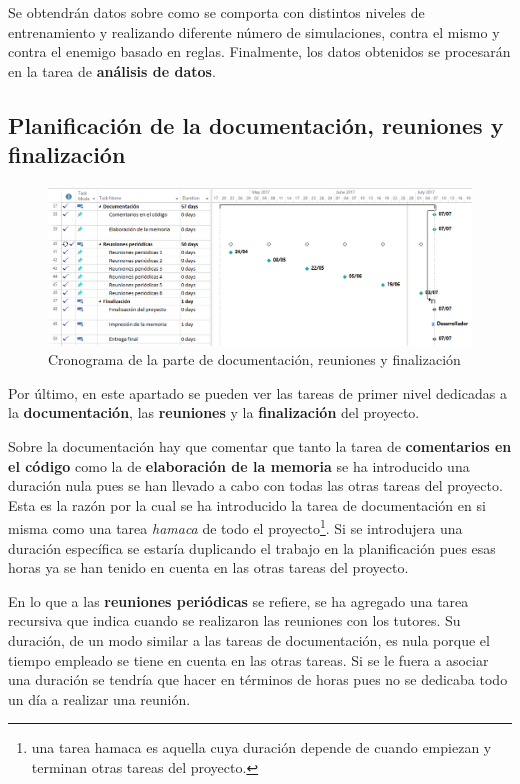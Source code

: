 \bigskip

Se obtendrán datos sobre como se comporta con distintos niveles de entrenamiento y realizando diferente número de simulaciones, contra el mismo y contra el enemigo basado en reglas. Finalmente, los datos obtenidos se procesarán en la tarea de \textbf{análisis de datos}.


\subsection{Planificación de la documentación, reuniones y finalización}

\begin{figure}
	\centerline{\includegraphics[width=19cm]{otros/capturasPlanificacion/documentacion_reuniones_final.PNG}}
	\caption{Cronograma de la parte de documentación, reuniones y finalización}
	\label{plan:fin}
\end{figure}

Por último, en este apartado se pueden ver las tareas de primer nivel dedicadas a la \textbf{documentación}, las \textbf{reuniones} y la \textbf{finalización} del proyecto.

\bigskip

Sobre la documentación hay que comentar que tanto la tarea de \textbf{comentarios en el código} como la de \textbf{elaboración de la memoria} se ha introducido una duración nula pues se han llevado a cabo con todas las otras tareas del proyecto. Esta es la razón por la cual se ha introducido la tarea de documentación en si misma como una tarea \textit{hamaca} de todo el proyecto\footnote{una tarea hamaca es aquella cuya duración depende de cuando empiezan y terminan otras tareas del proyecto.}. Si se introdujera una duración específica se estaría duplicando el trabajo en la planificación pues esas horas ya se han tenido en cuenta en las otras tareas del proyecto.

\bigskip

En lo que a las \textbf{reuniones periódicas} se refiere, se ha agregado una tarea recursiva que indica cuando se realizaron las reuniones con los tutores. Su duración, de un modo similar a las tareas de documentación, es nula porque el tiempo empleado se tiene en cuenta en las otras tareas. Si se le fuera a asociar una duración se tendría que hacer en términos de horas pues no se dedicaba todo un día a realizar una reunión.

